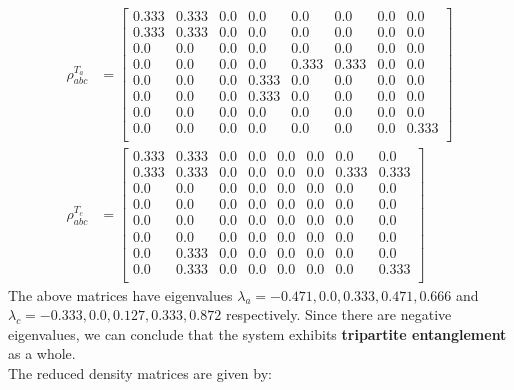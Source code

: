 \documentclass{scrartcl}
\begin{document}
    \begin{align}
        \rho^{T_a}_{abc} &=
        \left[
        \begin{array}{cccccccc}
        0.333 & 0.333 & 0.0 & 0.0 & 0.0 & 0.0 & 0.0 & 0.0 \\
        0.333 & 0.333 & 0.0 & 0.0 & 0.0 & 0.0 & 0.0 & 0.0 \\
        0.0 & 0.0 & 0.0 & 0.0 & 0.0 & 0.0 & 0.0 & 0.0 \\
        0.0 & 0.0 & 0.0 & 0.0 & 0.333 & 0.333 & 0.0 & 0.0 \\
        0.0 & 0.0 & 0.0 & 0.333 & 0.0 & 0.0 & 0.0 & 0.0 \\
        0.0 & 0.0 & 0.0 & 0.333 & 0.0 & 0.0 & 0.0 & 0.0 \\
        0.0 & 0.0 & 0.0 & 0.0 & 0.0 & 0.0 & 0.0 & 0.0 \\
        0.0 & 0.0 & 0.0 & 0.0 & 0.0 & 0.0 & 0.0 & 0.333 \\
        \end{array}
        \right]\\
            \rho^{T_c}_{abc} &=
            \left[
            \begin{array}{cccccccc}
            0.333 & 0.333 & 0.0 & 0.0 & 0.0 & 0.0 & 0.0 & 0.0 \\
            0.333 & 0.333 & 0.0 & 0.0 & 0.0 & 0.0 & 0.333 & 0.333 \\
            0.0 & 0.0 & 0.0 & 0.0 & 0.0 & 0.0 & 0.0 & 0.0 \\
            0.0 & 0.0 & 0.0 & 0.0 & 0.0 & 0.0 & 0.0 & 0.0 \\
            0.0 & 0.0 & 0.0 & 0.0 & 0.0 & 0.0 & 0.0 & 0.0 \\
            0.0 & 0.0 & 0.0 & 0.0 & 0.0 & 0.0 & 0.0 & 0.0 \\
            0.0 & 0.333 & 0.0 & 0.0 & 0.0 & 0.0 & 0.0 & 0.0 \\
            0.0 & 0.333 & 0.0 & 0.0 & 0.0 & 0.0 & 0.0 & 0.333 \\
            \end{array}
            \right]
            \end{align}
            The above matrices have eigenvalues $\lambda_a =-0.471, 0.0, 0.333, 0.471, 0.666$ and $\lambda_c=-0.333, 0.0, 0.127, 0.333, 0.872 $ respectively. Since there are negative eigenvalues, we can conclude that the system exhibits \textbf{tripartite entanglement} as a whole.\\[0.3cm]
            The reduced density matrices are given by:
\end{document}

